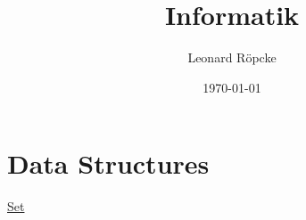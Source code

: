 \documentclass[12pt,a4paper]{article}
\title{Informatik}
\author{Leonard Röpcke}
\date{\today}
\begin{document}
\maketitle

\section{Data Structures}
\href{https://leonard-roepcke.github.io/Knowledge-Archive/knowledge/informatics/data_structure/set/set.pdf}{Set}
\end{document}
